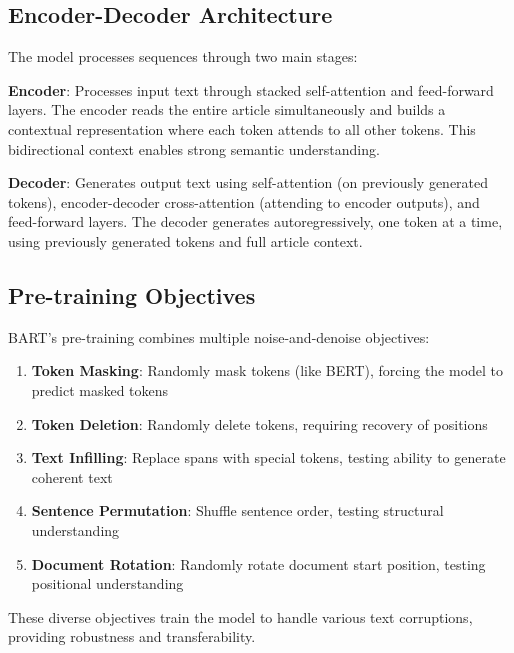 \documentclass[12pt,a4paper,oneside]{report}
\begin{document}
\subsection{Encoder-Decoder Architecture}
The model processes sequences through two main stages:

\textbf{Encoder}: Processes input text through stacked self-attention and feed-forward layers. The encoder reads the entire article simultaneously and builds a contextual representation where each token attends to all other tokens. This bidirectional context enables strong semantic understanding.

\textbf{Decoder}: Generates output text using self-attention (on previously generated tokens), encoder-decoder cross-attention (attending to encoder outputs), and feed-forward layers. The decoder generates autoregressively, one token at a time, using previously generated tokens and full article context.

\subsection{Pre-training Objectives}
BART's pre-training combines multiple noise-and-denoise objectives:
\begin{enumerate}
    \item \textbf{Token Masking}: Randomly mask tokens (like BERT), forcing the model to predict masked tokens
    \item \textbf{Token Deletion}: Randomly delete tokens, requiring recovery of positions
    \item \textbf{Text Infilling}: Replace spans with special tokens, testing ability to generate coherent text
    \item \textbf{Sentence Permutation}: Shuffle sentence order, testing structural understanding
    \item \textbf{Document Rotation}: Randomly rotate document start position, testing positional understanding
\end{enumerate}

These diverse objectives train the model to handle various text corruptions, providing robustness and transferability.
\end{document}
